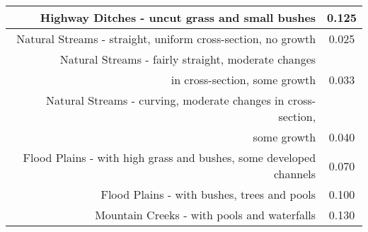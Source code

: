 \documentclass[10pt, oneside]{amsart}
\begin{document}
\begin{center}
\begin{tabular}{rc}
		Highway Ditches - uncut grass and small bushes                     & 0.125                   \\ \midrule
		
		Natural Streams - straight, uniform cross-section, no growth       & 0.025                   \\ \midrule
		
		Natural Streams - fairly straight, moderate changes           &   \\ in cross-section, some growth & 0.033 \\ \midrule
		
		Natural Streams - curving, moderate changes in cross-section, &   \\some growth & 0.040 \\ \midrule
		
		Flood Plains - with high grass and bushes, some developed channels & 0.070                   \\ \midrule
		
		Flood Plains - with bushes, trees and pools                        & 0.100                   \\ \midrule
		
		Mountain Creeks - with pools and waterfalls                        & 0.130                   \\ \bottomrule
	\end{tabular}
\end{center}
\vspace{1.5cm}
\end{document}
